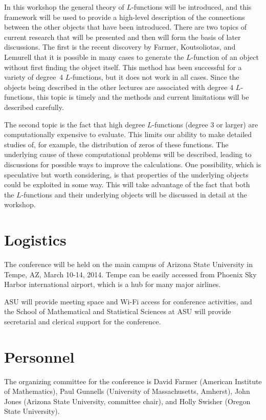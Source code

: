 \documentclass[12pt]{amsart}
\numberwithin{equation}{section}
\begin{document}
In this workshop the general theory of $L$-functions will be
introduced, and this framework will be used to provide a high-level
description of the connections between the other objects that have
been introduced.  There are two topics of current research that will
be presented and then will form the basis of later discussions.  The
first is the recent discovery by Farmer, Koutsoliotas, and Lemurell
that it is possible in many cases to generate the $L$-function of an
object without first finding the object itself.  This method has been
successful for a variety of degree~4 $L$-functions, but it does not
work in all cases.  Since the objects being described in the other
lectures are associated with degree 4 $L$-functions, this topic is
timely and the methods and current limitations will be described
carefully.

The second topic is the fact that high degree $L$-functions (degree 3
or larger) are computationally expensive to evaluate.  This limits our
ability to make detailed studies of, for example, the distribution of
zeros of these functions.  The underlying cause of these computational
problems will be described, leading to discussions for possible ways
to improve the calculations.  One possibility, which is speculative
but worth considering, is that properties of the underlying objects
could be exploited in some way.  This will take advantage of the fact
that both the $L$-functions and their underlying objects will be
discussed in detail at the workshop.

\section{Logistics}

The conference will be held on the main campus of Arizona State
University in Tempe, AZ, March 10-14, 2014.  Tempe can be easily
accessed from Phoenix Sky Harbor international airport, which is a hub
for many major airlines.

ASU will provide meeting space and Wi-Fi access for conference
activities, and the School of Mathematical and Statistical Sciences at
ASU will provide secretarial and clerical support for the conference.

\section{Personnel}

The organizing committee for the conference is David Farmer (American
Institute of Mathematics), Paul Gunnells (University of Massachusetts,
Amherst), John Jones (Arizona State University, committee chair), and
Holly Swisher (Oregon State University).
%
\end{document}

